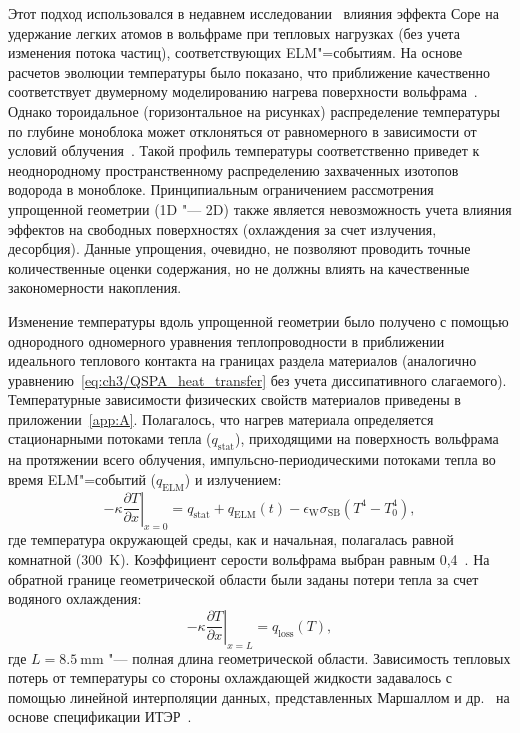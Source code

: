 Этот подход использовался в недавнем исследовании~\cite{Dasgupta2023} влияния эффекта Соре на удержание легких атомов в вольфраме при тепловых нагрузках (без учета изменения потока частиц), соответствующих ELM"=событиям. На основе расчетов эволюции температуры было показано, что приближение качественно соответствует двумерному моделированию нагрева поверхности вольфрама~\cite{VandenKerkhof2021}. Однако тороидальное (горизонтальное на рисунках) распределение температуры по глубине моноблока может отклоняться от равномерного в зависимости от условий облучения~\cite{Delaporte-Mathurin2020, Delaporte-Mathurin2023}. Такой профиль температуры соответственно приведет к неоднородному пространственному распределению захваченных изотопов водорода в моноблоке. Принципиальным ограничением рассмотрения упрощенной геометрии (1D "--- 2D) также является невозможность учета влияния эффектов на свободных поверхностях (охлаждения за счет излучения, десорбция). Данные упрощения, очевидно, не позволяют проводить точные количественные оценки содержания, но не должны влиять на качественные закономерности накопления.

Изменение температуры вдоль упрощенной геометрии было получено с помощью однородного одномерного уравнения теплопроводности в приближении идеального теплового контакта на границах раздела материалов (аналогично уравнению~\cref{eq:ch3/QSPA_heat_transfer} без учета диссипативного слагаемого). Температурные зависимости физических свойств материалов приведены в приложении~\cref{app:A}. Полагалось, что нагрев материала определяется стационарными потоками тепла (\( q_\mathrm{stat} \)), приходящими на поверхность вольфрама на протяжении всего облучения, импульсно-периодическими потоками тепла во время ELM"=событий (\( q_\mathrm{ELM} \)) и излучением:
\begin{equation}
	\label{eq:ch3/left_BC_ITER}
	\left.-\kappa\frac{\partial T}{\partial x}\right\vert_{x=0}=q_{\mathrm{stat}}+q_{\mathrm{ELM}}(t)-\epsilon_{\mathrm{W}}\sigma_\mathrm{SB}(T^4-T_0^4),
\end{equation}
где температура окружающей среды, как и начальная, полагалась равной комнатной (\SI{300}{\kelvin}). Коэффициент серости вольфрама выбран равным 0,4~\cite{weast1975crc}. На обратной границе геометрической области были заданы потери тепла за счет водяного охлаждения:
\begin{equation}
	\label{eq:ch3/right_BC_ITER}
	\left.-\kappa\frac{\partial T}{\partial x}\right\vert_{x=L}=q_{\mathrm{loss}}(T),
\end{equation}
где \( L=\SI{8.5}{\milli\meter} \) "--- полная длина геометрической области. Зависимость тепловых потерь от температуры со стороны охлаждающей жидкости задавалось с помощью линейной интерполяции данных, представленных Маршаллом и др.~\cite{Marshall2001} на основе спецификации ИТЭР~\cite{komarov2013thermal}.

